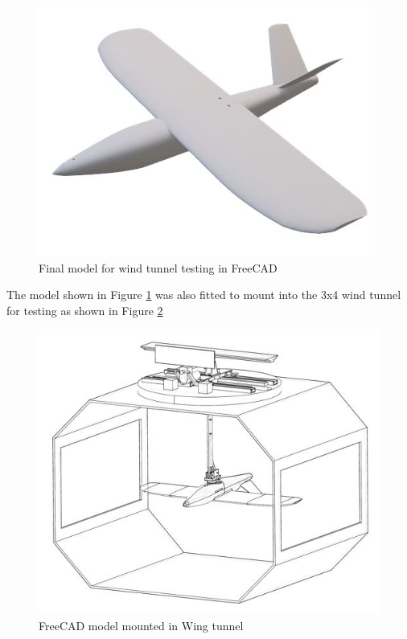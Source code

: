 \begin{figure}[H]
\centering
\includegraphics[]{04_Methodology/Figs/model2.jpg}
\caption{Final model for wind tunnel testing in FreeCAD}
\label{fig:freeCADModel}
\end{figure}


The model shown in Figure \ref{fig:freeCADModel} was also fitted to mount into the 3x4 wind tunnel for testing as shown in Figure \ref{fig:modelWithTunnel}

\begin{figure}
    \centering
    \includegraphics{04_Methodology/Figs/ModelWithtunnel.JPG}
    \caption{FreeCAD model mounted in Wing tunnel }
    \label{fig:modelWithTunnel}
\end{figure}


